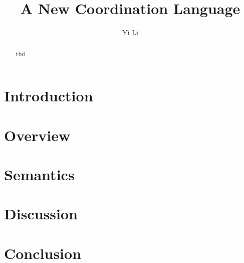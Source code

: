 \documentclass{llncs}
\title{A New Coordination Language \lang}
\author{
Yi Li
}
\begin{document}
\maketitle

\begin{abstract}
tbd
\end{abstract}

\section{Introduction}

\section{Overview}



\section{Semantics}

\section{Discussion}

\section{Conclusion}

\cite{ArbabMscs2004}



\end{document}

